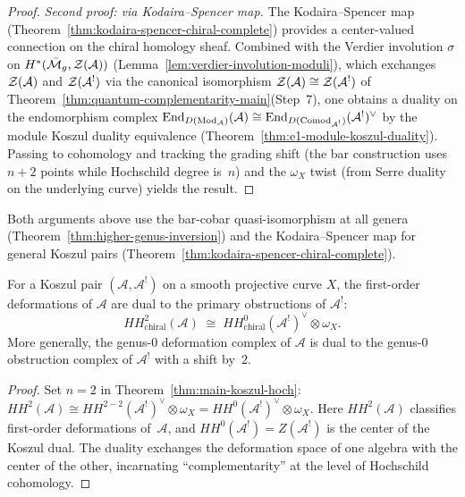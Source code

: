 \begin{proof}
\medskip\noindent\emph{Second proof: via Kodaira--Spencer map.}
The Kodaira--Spencer map
(Theorem~\ref{thm:kodaira-spencer-chiral-complete}) provides a
center-valued connection on the chiral homology sheaf.  Combined with the
Verdier involution $\sigma$ on $H^*(\bar{\mathcal{M}}_g, \mathcal{Z}(\mathcal{A}))$
(Lemma~\ref{lem:verdier-involution-moduli}), which exchanges
$\mathcal{Z}(\mathcal{A})$ and $\mathcal{Z}(\mathcal{A}^!)$ via the canonical isomorphism
$\mathcal{Z}(\mathcal{A}) \cong \mathcal{Z}(\mathcal{A}^!)$ of
Theorem~\ref{thm:quantum-complementarity-main}(Step~7), one obtains
a duality on the endomorphism complex
$\mathrm{End}_{D(\mathrm{Mod}_{\mathcal{A}})}(\mathcal{A}) \cong
\mathrm{End}_{D(\mathrm{Comod}_{\mathcal{A}^!})}(\mathcal{A}^!)^{\vee}$
by the module Koszul duality equivalence
(Theorem~\ref{thm:e1-module-koszul-duality}).
Passing to cohomology and tracking the grading shift
(the bar construction uses $n+2$ points while Hochschild degree is~$n$)
and the $\omega_X$ twist (from Serre duality on the underlying curve) yields the result.
\end{proof}

\begin{remark}
Both arguments above use the bar-cobar quasi-isomorphism at all genera
(Theorem~\ref{thm:higher-genus-inversion}) and the Kodaira--Spencer map
for general Koszul pairs
(Theorem~\ref{thm:kodaira-spencer-chiral-complete}).
\end{remark}

\begin{corollary}\label{cor:def-obs-exchange-genus0}
For a Koszul pair $(\mathcal{A}, \mathcal{A}^!)$ on a smooth projective curve $X$, the first-order deformations of $\mathcal{A}$ are dual to the primary obstructions of $\mathcal{A}^!$:
\begin{equation}\label{eq:def-obs-genus0}
HH^2_{\mathrm{chiral}}(\mathcal{A}) \;\cong\; HH^0_{\mathrm{chiral}}(\mathcal{A}^!)^{\vee} \otimes \omega_X.
\end{equation}
More generally, the genus-$0$ deformation complex of $\mathcal{A}$ is dual to the genus-$0$ obstruction complex of $\mathcal{A}^!$ with a shift by~$2$.
\end{corollary}

\begin{proof}
Set $n = 2$ in Theorem~\ref{thm:main-koszul-hoch}: $HH^2(\mathcal{A}) \cong HH^{2-2}(\mathcal{A}^!)^\vee \otimes \omega_X = HH^0(\mathcal{A}^!)^\vee \otimes \omega_X$.  Here $HH^2(\mathcal{A})$ classifies first-order deformations of~$\mathcal{A}$, and $HH^0(\mathcal{A}^!) = Z(\mathcal{A}^!)$ is the center of the Koszul dual.  The duality exchanges the deformation space of one algebra with the center of the other, incarnating ``complementarity'' at the level of Hochschild cohomology.
\end{proof}

